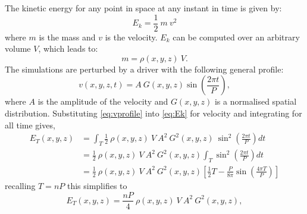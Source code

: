 The kinetic energy for any point in space at any instant in time is given by:
\begin{equation}
    E_k = \frac{1}{2}\ m\ v^2\label{eq:Ek}
\end{equation}
where $m$ is the mass and $v$ is the velocity.
$E_k$ can be computed over an arbitrary volume $V$, which leads to:
\begin{equation}
    m = \rho(x,y,z)\ V.\label{eq:mass}
\end{equation}
The simulations are perturbed by a driver with the following general profile:
\begin{equation}
    v(x,y,z,t) = A\ G(x,y,z) \sin \left( \frac{2\pi t}{P} \right),\label{eq:vprofile}
\end{equation}
where $A$ is the amplitude of the velocity and $G(x,y,z)$ is a normalised spatial distribution.
Substituting \cref{eq:vprofile} into \cref{eq:Ek} for velocity and integrating for all time gives,
\begin{align}
    E_{T}(x,y,z) &= \int_T \frac{1}{2}\ \rho(x,y,z)\ V\ A^2\ G^2(x,y,z)\ \sin^2\left(\frac{2\pi t}{P} \right) dt \\
    &= \frac{1}{2}\ \rho(x,y,z)\ V\ A^2\ G^2(x,y,z) \int_T \sin^2\left(\frac{2\pi t}{P} \right) dt \\
    & = \frac{1}{2}\ \rho(x,y,z)\ V\ A^2\ G^2(x,y,z) \left[ \frac{1}{2}T - \frac{P}{8\pi} \sin \left(\frac{4\pi T}{P} \right) \right]
\end{align}
recalling $T = nP$ this simplifies to 
\begin{equation}
    E_{T}(x,y,z) = \frac{nP}{4}\ \rho(x,y,z)\ V\ A^2\ G^2(x,y,z), \label{eq:Et_xyz}
\end{equation}

